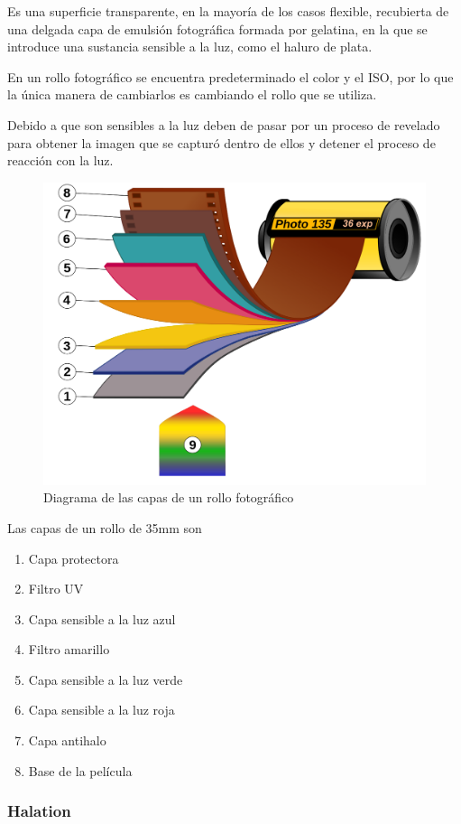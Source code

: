 \documentclass{article}
\begin{document}
Es una superficie transparente, en la mayoría de los casos flexible, recubierta de una delgada capa de emulsión fotográfica formada por gelatina, en la que se introduce una sustancia sensible a la luz, como el haluro de plata.

En un rollo fotográfico se encuentra predeterminado el color y el ISO, por lo que la única manera de cambiarlos es cambiando el rollo que se utiliza.

Debido a que son sensibles a la luz deben de pasar por un proceso de revelado para obtener la imagen que se capturó dentro de ellos y detener el proceso de reacción con la luz. 

\begin{figure}[H]
	\centering
	\includegraphics[width=0.65\linewidth]{Figuras/Film_2}
	\caption{Diagrama de las capas de un rollo fotográfico}
	\label{fig:film2}
\end{figure}

Las capas de un rollo de 35mm son

\begin{enumerate}
	\item Capa protectora
	\item Filtro UV
	\item Capa sensible a la luz azul
	\item Filtro amarillo
	\item Capa sensible a la luz verde
	\item Capa sensible a la luz roja
	\item Capa antihalo
	\item Base de la película
\end{enumerate}

\subsubsection{Halation}
\end{document}
